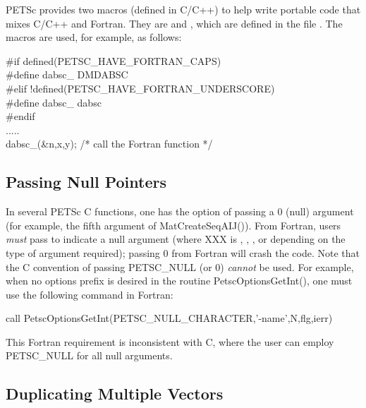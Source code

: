 PETSc provides two macros (defined in C/C++) to help write 
portable code that mixes C/C++ and Fortran. They are 
 and 
 ,
which are defined in the file .
The macros are used, for example, as follows:
\begin{tabbing}
   \#if defined(PETSC\_HAVE\_FORTRAN\_CAPS)\\
   \#define dabsc\_ DMDABSC\\
   \#elif !defined(PETSC\_HAVE\_FORTRAN\_UNDERSCORE)\\
   \#define dabsc\_ dabsc\\
   \#endif\\
   .....\\
   dabsc\_(\&n,x,y); /* call the Fortran function */
\end{tabbing}


\subsection{Passing Null Pointers}

In several PETSc C functions, one has the option of passing a 0 (null)
argument (for example, the fifth argument of MatCreateSeqAIJ()).
From Fortran, users {\em must} pass  to indicate a
null argument (where XXX is , , ,
or  depending on the type of argument required); 
 passing  0 from 
 Fortran   will crash
the code.   Note
that the C convention of passing PETSC_NULL (or 0) {\em cannot}
be used.  For example, when no options prefix is desired in the
routine PetscOptionsGetInt(), one must use the following command in
Fortran:
\begin{tabbing}
    call PetscOptionsGetInt(PETSC\_NULL\_CHARACTER,'-name',N,flg,ierr)
\end{tabbing}

This Fortran requirement is inconsistent with C, where the 
user can employ PETSC_NULL for all null arguments. 

\subsection{Duplicating Multiple Vectors}
\label{sec_fortvecd}

